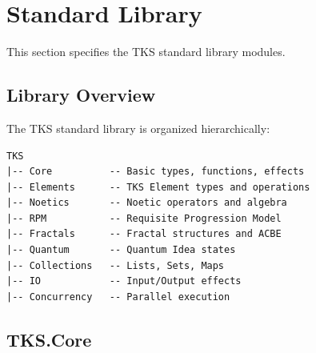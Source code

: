 \section{Standard Library}
\label{sec:standard-library}

This section specifies the TKS standard library modules.

\subsection{Library Overview}
\label{subsec:library-overview}

\begin{definition}
\label{def:stdlib-structure}
The TKS standard library is organized hierarchically:
\begin{verbatim}
TKS
|-- Core          -- Basic types, functions, effects
|-- Elements      -- TKS Element types and operations
|-- Noetics       -- Noetic operators and algebra
|-- RPM           -- Requisite Progression Model
|-- Fractals      -- Fractal structures and ACBE
|-- Quantum       -- Quantum Idea states
|-- Collections   -- Lists, Sets, Maps
|-- IO            -- Input/Output effects
|-- Concurrency   -- Parallel execution
\end{verbatim}
\end{definition}

\subsection{TKS.Core}
\label{subsec:tks-core}

